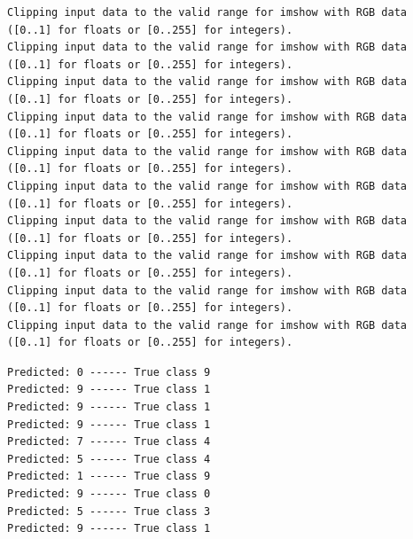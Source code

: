 \documentclass[11pt]{article}
\begin{document}
    \begin{Verbatim}[commandchars=\\\{\}]
Clipping input data to the valid range for imshow with RGB data ([0..1] for floats or [0..255] for integers).
Clipping input data to the valid range for imshow with RGB data ([0..1] for floats or [0..255] for integers).
Clipping input data to the valid range for imshow with RGB data ([0..1] for floats or [0..255] for integers).
Clipping input data to the valid range for imshow with RGB data ([0..1] for floats or [0..255] for integers).
Clipping input data to the valid range for imshow with RGB data ([0..1] for floats or [0..255] for integers).
Clipping input data to the valid range for imshow with RGB data ([0..1] for floats or [0..255] for integers).
Clipping input data to the valid range for imshow with RGB data ([0..1] for floats or [0..255] for integers).
Clipping input data to the valid range for imshow with RGB data ([0..1] for floats or [0..255] for integers).
Clipping input data to the valid range for imshow with RGB data ([0..1] for floats or [0..255] for integers).
Clipping input data to the valid range for imshow with RGB data ([0..1] for floats or [0..255] for integers).

    \end{Verbatim}

    \begin{Verbatim}[commandchars=\\\{\}]
Predicted: 0 ------ True class 9
Predicted: 9 ------ True class 1
Predicted: 9 ------ True class 1
Predicted: 9 ------ True class 1
Predicted: 7 ------ True class 4
Predicted: 5 ------ True class 4
Predicted: 1 ------ True class 9
Predicted: 9 ------ True class 0
Predicted: 5 ------ True class 3
Predicted: 9 ------ True class 1

    \end{Verbatim}

    \begin{center}
    \end{center}
    { \hspace*{\fill} \\}
    

    
    
    
    
\end{document}
